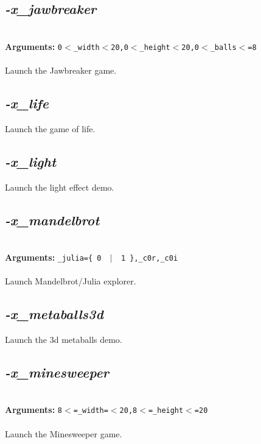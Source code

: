 \documentclass[a4paper,11pt,twoside]{book}
\begin{document}
\subsection{\emph{-x\_jawbreaker} }\vspace*{-0.5em}
~\\\textbf{Arguments: } 
{\small \texttt{0$<$\_width$<$20,0$<$\_height$<$20,0$<$\_balls$<$=8}}\\~\\
Launch the Jawbreaker game.


\subsection{\emph{-x\_life} }\vspace*{-0.5em}
Launch the game of life.


\subsection{\emph{-x\_light} }\vspace*{-0.5em}
Launch the light effect demo.


\subsection{\emph{-x\_mandelbrot} }\vspace*{-0.5em}
~\\\textbf{Arguments: } 
{\small \texttt{\_julia=\{ 0 ~$|$~ 1 \},\_c0r,\_c0i}}\\~\\
Launch Mandelbrot/Julia explorer.


\subsection{\emph{-x\_metaballs3d} }\vspace*{-0.5em}
Launch the 3d metaballs demo.


\subsection{\emph{-x\_minesweeper} }\vspace*{-0.5em}
~\\\textbf{Arguments: } 
{\small \texttt{8$<$=\_width=$<$20,8$<$=\_height$<$=20}}\\~\\
Launch the Minesweeper game.
\end{document}
